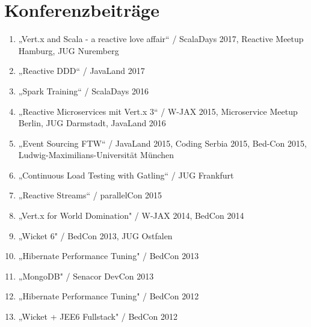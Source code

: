 \section*{Konferenzbeiträge}
\begin{enumerate}[label=,leftmargin=0cm,itemsep=10pt]
\item „Vert.x and Scala - a reactive love affair“ / ScalaDays 2017, Reactive Meetup Hamburg, JUG Nuremberg
\item „Reactive DDD“ / JavaLand 2017
\item „Spark Training“ / ScalaDays 2016
\item „Reactive Microservices mit Vert.x 3“ / W-JAX 2015, Microservice Meetup Berlin, JUG Darmstadt, JavaLand 2016
\item „Event Sourcing FTW“ / JavaLand 2015, Coding Serbia 2015, Bed-Con 2015, Ludwig-Maximilians-Universität München
\item „Continuous Load Testing with Gatling“ / JUG Frankfurt
\item „Reactive Streams“ / parallelCon 2015
\item „Vert.x for World Domination" / W-JAX 2014, BedCon 2014
\item „Wicket 6" / BedCon 2013, JUG Ostfalen
\item „Hibernate Performance Tuning" / BedCon 2013
\item „MongoDB" / Senacor DevCon 2013
\item „Hibernate Performance Tuning" / BedCon 2012
\item „Wicket + JEE6 Fullstack" / BedCon 2012
\end{enumerate}

